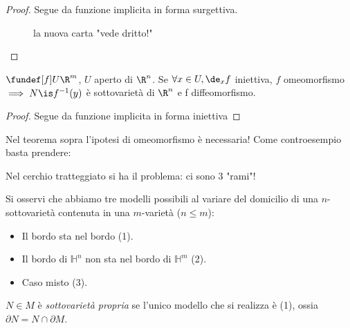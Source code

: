 \begin{proof}
 Segue da funzione implicita in forma surgettiva.
 \begin{figure}
  \centering
  
  \caption{la nuova carta "vede dritto!"}
 \end{figure}

\end{proof}
\begin{prop}
 $\fundef[f] U\R^m$, $U$ aperto di $\R^n$. Se $\forall x \in U, \de_xf$ iniettiva, $f$ omeomorfismo$\implies N\is f^{-1}(y)$ è sottovarietà di $\R^n$ e f diffeomorfismo.
\end{prop}
\begin{proof}
 Segue da funzione implicita in forma iniettiva
\end{proof}
\begin{oss}
 Nel teorema sopra l'ipotesi di omeomorfismo è necessaria!
 Come controesempio basta prendere:
 \begin{center}
  \centering
  
 \end{center}
 Nel cerchio tratteggiato si ha il problema: ci sono 3 "rami"!
\end{oss}
Si osservi che abbiamo tre modelli possibili al variare del domicilio di una  $n$-sottovarietà contenuta in una $m$-varietà ($n\le m$):
\begin{itemize}
 \item Il bordo sta nel bordo (1).
 \item Il bordo di $\mathbb H^n$ non sta nel bordo di $\mathbb H^m$ (2).
 \item Caso misto (3).
\end{itemize}
\begin{center}
 
\end{center}

\begin{defn}
 $N\in M$ è \emph{sottovarietà propria} se l'unico modello che si realizza è (1), ossia $\partial N = N\cap \partial M$.

\end{defn}
